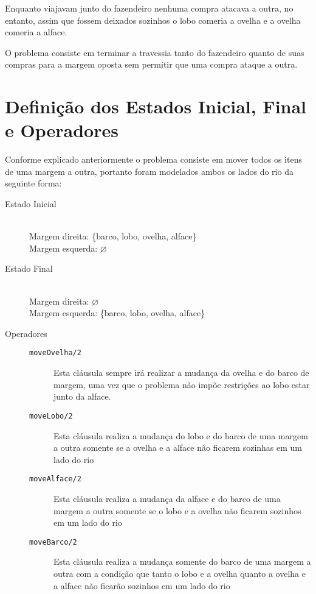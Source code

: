 \documentclass[brazil,times]{abnt}
\begin{document}
	Enquanto viajavam junto do fazendeiro nenhuma compra atacava a outra, no
	entanto, assim que fossem deixados sozinhos o lobo comeria a ovelha e a
	ovelha comeria a alface.
	
	O problema consiste em terminar a travessia tanto do fazendeiro
	quanto de suas compras para a margem oposta sem permitir que uma compra ataque
	a outra. \cite{ptwiki:problema-lobo-ovelha-alface}

\section*{Definição dos Estados Inicial, Final e Operadores}
	Conforme explicado anteriormente o problema consiste em mover todos os itens de
	uma margem a outra, portanto foram modelados ambos os lados do rio da seguinte
	forma:
	
	\begin{description}
		\item[Estado Inicial] \hfill \\
		Margem direita: \{barco, lobo, ovelha, alface\} \\
		Margem esquerda: $\varnothing$
		\item[Estado Final] \hfill \\
		Margem direita: $\varnothing$ \\
		Margem esquerda: \{barco, lobo, ovelha, alface\}
		\item[Operadores] \hfill
			\begin{description}
				\item[\texttt{moveOvelha/2}] Esta cláusula sempre irá realizar a
				mudança da ovelha e do barco de margem, uma vez que o problema não
				impõe restrições ao lobo estar junto da alface.
				\item[\texttt{moveLobo/2}] Esta cláusula realiza a mudança do lobo e do
				barco de uma margem a outra somente se a ovelha e a alface não ficarem
				sozinhas em um lado do rio
				\item[\texttt{moveAlface/2}] Esta cláusula realiza a mudança da alface e do
				barco de uma margem a outra somente se o lobo e a ovelha não ficarem
				sozinhos em um lado do rio 
				\item[\texttt{moveBarco/2}] Esta cláusula realiza a mudança somente do
				barco de uma margem a outra com a condição que tanto o lobo e a ovelha
				quanto a ovelha e a alface não ficarão sozinhos em um lado do rio 
			\end{description}
	\end{description}
\end{document}
